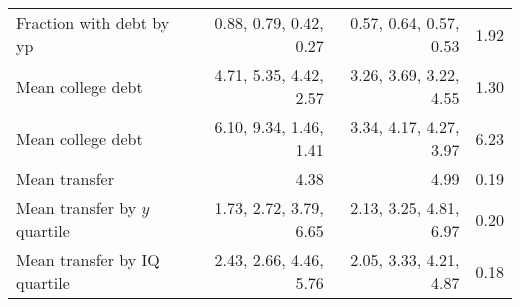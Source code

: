 \begin{tabular}{lrrr}
Fraction with debt by yp & 0.88, 0.79, 0.42, 0.27  & 0.57, 0.64, 0.57, 0.53  & 1.92  \\ 
Mean college debt & 4.71, 5.35, 4.42, 2.57  & 3.26, 3.69, 3.22, 4.55  & 1.30  \\ 
Mean college debt & 6.10, 9.34, 1.46, 1.41  & 3.34, 4.17, 4.27, 3.97  & 6.23  \\ 
Mean transfer & 4.38  & 4.99  & 0.19  \\ 
Mean transfer by $y$ quartile & 1.73, 2.72, 3.79, 6.65  & 2.13, 3.25, 4.81, 6.97  & 0.20  \\ 
Mean transfer by IQ quartile & 2.43, 2.66, 4.46, 5.76  & 2.05, 3.33, 4.21, 4.87  & 0.18  \\ 
\hline
\end{tabular}%
